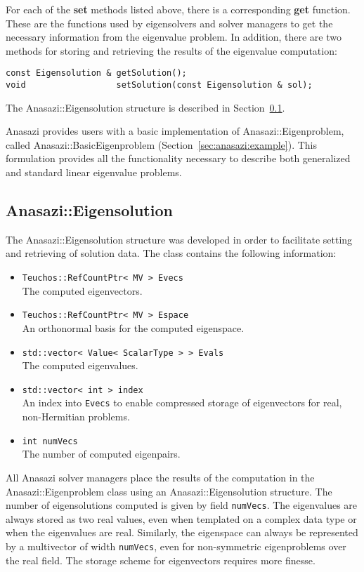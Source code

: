 For each of the \textbf{set} methods listed above, there is a corresponding
\textbf{get} function. These are the functions used by eigensolvers and solver managers to get
the necessary information from the eigenvalue problem. In addition, there are
two methods for storing and retrieving the results of the eigenvalue computation:
\begin{verbatim}
const Eigensolution & getSolution();
void                  setSolution(const Eigensolution & sol);
\end{verbatim}
The Anasazi::Eigensolution structure is described in
Section~\ref{sec:anasazi:eigensolution}.

Anasazi provides users with a basic implementation of
Anasazi::Eigenproblem, called Anasazi::BasicEigenproblem
(Section~\ref{sec:anasazi:example}).
This formulation provides all the functionality
necessary to describe both generalized and standard linear eigenvalue problems.


\subsection{Anasazi::Eigensolution}
\label{sec:anasazi:eigensolution}

The Anasazi::Eigensolution structure was developed in order to facilitate setting
and retrieving of solution data. The class contains the following information:
\begin{itemize}
  \item \verb!Teuchos::RefCountPtr< MV > Evecs! \\ 
   The computed eigenvectors.
 \item \verb!Teuchos::RefCountPtr< MV > Espace! \\ 
   An orthonormal basis for the computed eigenspace.
 \item \verb!std::vector< Value< ScalarType > > Evals! \\ 
   The computed eigenvalues.
 \item \verb!std::vector< int > index! \\ 
   An index into \verb!Evecs! to enable compressed storage of eigenvectors for real, non-Hermitian problems.
 \item \verb!int numVecs! \\
   The number of computed eigenpairs.
\end{itemize}

All Anasazi solver managers place the results of the computation in the
Anasazi::Eigenproblem class using an Anasazi::Eigensolution structure. The number of
eigensolutions computed is given by field \verb!numVecs!. The eigenvalues are
always stored as two real values, even when templated on a complex data type or when the eigenvalues
are real. Similarly, the eigenspace can always be represented by a multivector of width
\verb!numVecs!, even for non-symmetric eigenproblems over the real field. The storage
scheme for eigenvectors requires more finesse.

